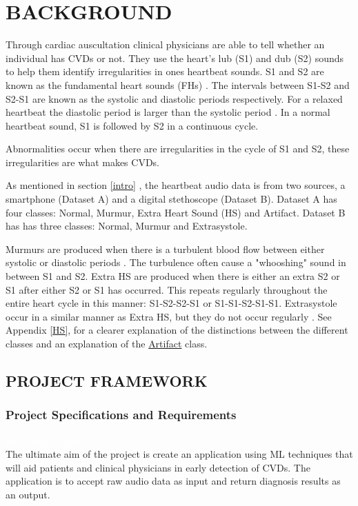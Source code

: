 \documentclass[10pt,twocolumn]{witseiepaper}
\begin{document}

\section{BACKGROUND}
\label{back}
Through cardiac auscultation clinical physicians are able to tell whether an individual has CVDs or not. They use the heart's lub (S1) and dub (S2) sounds to help them identify irregularities in ones heartbeat sounds. S1 and S2 are known as the fundamental heart  sounds (FHs) \cite{54}. The intervals between S1-S2 and S2-S1 are known as the systolic and diastolic periods respectively. For a relaxed heartbeat the diastolic period is larger than the systolic period \cite{orient2010sapira}. In a normal heartbeat sound, S1 is followed by S2 in a continuous cycle.

Abnormalities occur when there are irregularities in the cycle of S1 and S2, these irregularities are what makes CVDs. 

As mentioned in section \ref{intro} , the heartbeat audio data is from two sources, a smartphone (Dataset A) and a digital stethoscope (Dataset B). Dataset A has four classes: Normal, Murmur, Extra Heart Sound (HS) and Artifact. Dataset B has has three classes: Normal, Murmur and Extrasystole. 

Murmurs are produced when there is a turbulent blood flow between either systolic or diastolic periods \cite{35}. The turbulence often cause a "whooshing" sound in between S1 and S2. Extra HS are produced when there is either an extra S2 or S1 after either S2 or S1 has occurred. This repeats regularly throughout the entire heart cycle in this manner: S1-S2-S2-S1 or S1-S1-S2-S1-S1. Extrasystole occur in a similar manner as Extra HS, but they do not occur regularly \cite{bentley}. See Appendix \ref{HS}, for a clearer explanation of the distinctions between the different classes and an explanation of the \hyperref[sec:arti]{Artifact} class.

\subsection{PROJECT FRAMEWORK}
\subsubsection{Project Specifications and Requirements}
\label{sec:req}
\textcolor{white}{Ke a leboga Ntate}\\
The ultimate aim of the project is create an application using ML techniques that will aid patients and clinical physicians in early detection of CVDs. The application is to accept raw audio data as input and return diagnosis results as an output.
\end{document}
